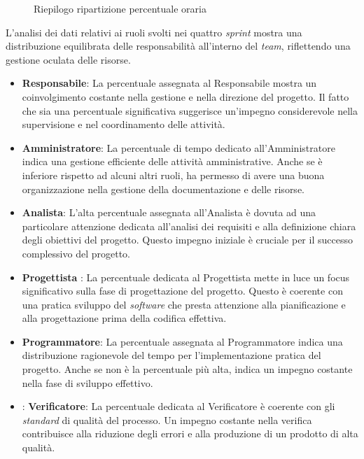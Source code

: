 \begin{figure}[h]
	\centering
	\caption{Riepilogo ripartizione percentuale oraria}
\end{figure}
\newpage

L'analisi dei dati relativi ai ruoli svolti nei quattro \textit{sprint} mostra una distribuzione equilibrata delle responsabilità all'interno del \textit{team}, riflettendo una gestione oculata delle risorse.
\begin{itemize}
	\item \textbf{Responsabile}: La percentuale assegnata al Responsabile mostra un coinvolgimento costante nella gestione e nella direzione del progetto. Il fatto che sia una percentuale significativa
	      suggerisce un'impegno considerevole nella supervisione e nel coordinamento delle attività.
	\item \textbf{Amministratore}: La percentuale di tempo dedicato all'Amministratore indica una gestione efficiente delle attività amministrative. Anche se è inferiore rispetto ad alcuni altri ruoli,
	      ha permesso di avere una buona organizzazione nella gestione della documentazione e delle risorse.
	\item \textbf{Analista}: L'alta percentuale assegnata all'Analista è dovuta ad una particolare attenzione dedicata all'analisi dei requisiti e alla definizione chiara degli obiettivi del progetto.
	      Questo impegno iniziale è cruciale per il successo complessivo del progetto.
	\item \textbf{Progettista} : La percentuale dedicata al Progettista mette in luce un focus significativo sulla fase di progettazione del progetto. Questo è coerente con una pratica sviluppo del \textit{software}
	      che presta attenzione alla pianificazione e alla progettazione prima della codifica effettiva.
	\item \textbf{Programmatore}: La percentuale assegnata al Programmatore indica una distribuzione ragionevole del tempo per l'implementazione pratica del progetto. Anche se non è la percentuale più alta,
	      indica un impegno costante nella fase di sviluppo effettivo.
	\item: \textbf{Verificatore}: La percentuale dedicata al Verificatore è coerente con gli \textit{standard} di qualità del processo. Un impegno costante nella verifica contribuisce alla riduzione degli errori e
	      alla produzione di un prodotto di alta qualità.
\end{itemize}

